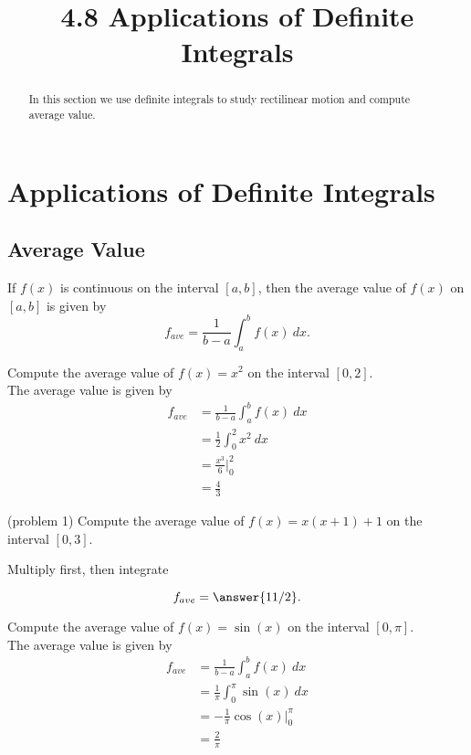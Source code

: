 \documentclass[handout]{ximera}
\title{4.8 Applications of Definite Integrals}
\begin{document}
\begin{abstract}
In this section we use definite integrals to study rectilinear motion and compute average value.
\end{abstract}

\maketitle



\section{Applications of Definite Integrals}


\subsection{Average Value}
\begin{definition}
If $f(x)$ is continuous on the interval $[a,b]$, then the average value 
of $f(x)$ on $[a,b]$ is given by
\[f_{ave} = \frac{1}{b-a}\int_a^b f(x) \ dx.\]
\end{definition}



\begin{example}[example 1]
Compute the average value of $f(x) = x^2$ on the interval $[0,2]$.\\
The average value is given by 
\begin{align*}
f_{ave} &= \frac{1}{b-a}\int_a^b f(x) \ dx \\
 & = \frac12\int_0^2 x^2 \ dx \\
 & = \frac{x^3}{6} \Bigg|_0^2 \\
  & = \tfrac43
\end{align*}
\end{example}



\begin{problem}(problem 1)
Compute the average value of $f(x) = x(x+1) +1$ on the interval $[0,3]$.
\begin{hint}
Multiply first, then integrate
\end{hint}
\[f_{ave} = \answer{11/2}.\]
\end{problem} 



\begin{example}[example 2]
Compute the average value of $f(x) = \sin(x)$ on the interval $[0,\pi]$.\\
The average value is given by 
\begin{align*}
f_{ave} &= \frac{1}{b-a}\int_a^b f(x) \ dx \\
 & = \frac{1}{\pi}\int_0^\pi \sin(x) \ dx \\
 & = -\frac{1}{\pi} \cos(x) \Bigg|_0^\pi \\
  & = \frac{2}{\pi}
\end{align*}
\end{example}
\end{document}
